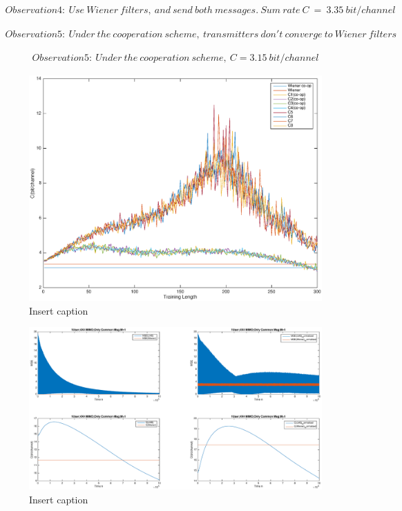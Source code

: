 \documentclass[11pt, oneside]{article}   	%
\begin{document}
\begin{align*}
Observation4:\ Use\ Wiener\ filters,\ and\  send\ both\ messages.\ Sum\ rate\ C\ =\ 3.35\ bit/channel
\end{align*}

\begin{align*}
Observation5:\ Under\ the\ cooperation\ scheme,\ transmitters\ don't\ converge\ to\ Wiener\ filters 
\end{align*}

\begin{align*}
Observation5:\ Under\ the\ cooperation\ scheme,\ C=3.15\ bit/channel
\end{align*}



\begin{figure}[bp!]
    \centering
    \includegraphics[width=150mm]{01}
    \caption{Insert caption}
\end{figure} 

\begin{figure}[bp!]
    \centering
    \centerline{\includegraphics[width=220mm]{1USER_4X4MIMO}}
    \caption{Insert caption}
\end{figure} 
\end{document}
